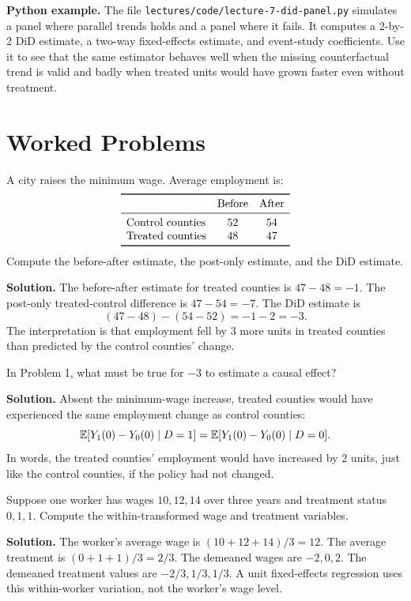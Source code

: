 \begin{boxD}
\textbf{Python example.} The file
\texttt{lectures/code/lecture-7-did-panel.py} simulates a panel where parallel
trends holds and a panel where it fails. It computes a 2-by-2 DiD estimate, a
two-way fixed-effects estimate, and event-study coefficients. Use it to see that
the same estimator behaves well when the missing counterfactual trend is valid
and badly when treated units would have grown faster even without treatment.
\end{boxD}

\section{Worked Problems}

\begin{exmp}
A city raises the minimum wage. Average employment is:
\[
\begin{array}{lcc}
\toprule
& \text{Before} & \text{After}\\
\midrule
\text{Control counties} & 52 & 54\\
\text{Treated counties} & 48 & 47\\
\bottomrule
\end{array}
\]
Compute the before-after estimate, the post-only estimate, and the DiD estimate.

\textbf{Solution.} The before-after estimate for treated counties is
$47-48=-1$. The post-only treated-control difference is $47-54=-7$. The DiD
estimate is
\[
    (47-48)-(54-52)=-1-2=-3.
\]
The interpretation is that employment fell by 3 more units in treated counties
than predicted by the control counties' change.
\end{exmp}

\begin{exmp}
In Problem 1, what must be true for $-3$ to estimate a causal effect?

\textbf{Solution.} Absent the minimum-wage increase, treated counties would have
experienced the same employment change as control counties:
\[
    \mathbb{E}[Y_{1}(0)-Y_{0}(0)\mid D=1]
    =
    \mathbb{E}[Y_{1}(0)-Y_{0}(0)\mid D=0].
\]
In words, the treated counties' employment would have increased by 2 units, just
like the control counties, if the policy had not changed.
\end{exmp}

\begin{exmp}
Suppose one worker has wages $10,12,14$ over three years and treatment status
$0,1,1$. Compute the within-transformed wage and treatment variables.

\textbf{Solution.} The worker's average wage is $(10+12+14)/3=12$. The average
treatment is $(0+1+1)/3=2/3$. The demeaned wages are $-2,0,2$. The demeaned
treatment values are $-2/3,1/3,1/3$. A unit fixed-effects regression uses this
within-worker variation, not the worker's wage level.
\end{exmp}

